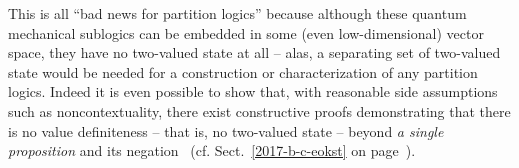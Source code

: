 This is all ``bad news for partition logics'' because although these
quantum mechanical sublogics
can be embedded in some (even low-dimensional) vector space,
they have no two-valued state at all -- alas, a separating set of two-valued state would be needed for a construction
or characterization of any partition logics.
Indeed it is even possible to show that, with reasonable side assumptions such as noncontextuality, there exist
constructive proofs demonstrating that there is no value definiteness -- that is,
no two-valued state -- beyond {\em a single proposition}
and its negation~\cite{2012-incomput-proofsCJ,PhysRevA.89.032109,2015-AnalyticKS}
(cf. Sect.~\ref{2017-b-c-eokst} on page~\pageref{2017-b-c-eokst}).
